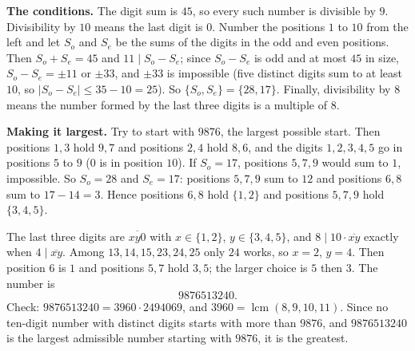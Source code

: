 \textbf{The conditions.} The digit sum is $45$, so every such number is divisible by $9$. Divisibility by $10$ means the last digit is $0$. Number the positions $1$ to $10$ from the left and let $S_o$ and $S_e$ be the sums of the digits in the odd and even positions. Then $S_o+S_e=45$ and $11\mid S_o-S_e$; since $S_o-S_e$ is odd and at most $45$ in size, $S_o-S_e=\pm11$ or $\pm33$, and $\pm33$ is impossible (five distinct digits sum to at least $10$, so $|S_o-S_e|\le35-10=25$). So $\{S_o,S_e\}=\{28,17\}$. Finally, divisibility by $8$ means the number formed by the last three digits is a multiple of $8$.

\textbf{Making it largest.} Try to start with $9876$, the largest possible start. Then positions $1,3$ hold $9,7$ and positions $2,4$ hold $8,6$, and the digits $1,2,3,4,5$ go in positions $5$ to $9$ ($0$ is in position $10$). If $S_o=17$, positions $5,7,9$ would sum to $1$, impossible. So $S_o=28$ and $S_e=17$: positions $5,7,9$ sum to $12$ and positions $6,8$ sum to $17-14=3$. Hence positions $6,8$ hold $\{1,2\}$ and positions $5,7,9$ hold $\{3,4,5\}$.

The last three digits are $\overline{xy0}$ with $x\in\{1,2\}$, $y\in\{3,4,5\}$, and $8\mid10\cdot\overline{xy}$ exactly when $4\mid\overline{xy}$. Among $13,14,15,23,24,25$ only $24$ works, so $x=2$, $y=4$. Then position $6$ is $1$ and positions $5,7$ hold $3,5$; the larger choice is $5$ then $3$. The number is
\[
\boxed{9876513240}.
\]
Check: $9876513240=3960\cdot2494069$, and $3960=\operatorname{lcm}(8,9,10,11)$. Since no ten-digit number with distinct digits starts with more than $9876$, and $9876513240$ is the largest admissible number starting with $9876$, it is the greatest.
